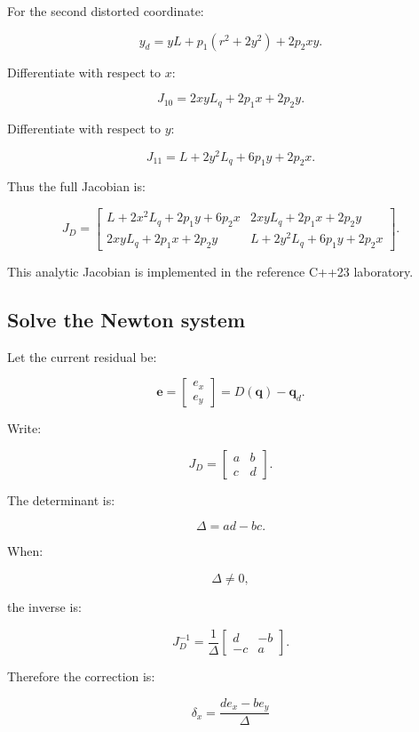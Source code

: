 For the second distorted coordinate:

\[
 y_d=yL+p_1(r^2+2y^2)+2p_2xy.
\]

Differentiate with respect to \(x\):

\[
 \boxed{ J_{10}= 2xyL_q+2p_1x+2p_2y }.
\]

Differentiate with respect to \(y\):

\[
 \boxed{ J_{11}= L+2y^2L_q+6p_1y+2p_2x }.
\]

Thus the full Jacobian is:

\[
 \boxed{ J_D= \begin{bmatrix} L+2x^2L_q+2p_1y+6p_2x& 2xyL_q+2p_1x+2p_2y\\ 2xyL_q+2p_1x+2p_2y& L+2y^2L_q+6p_1y+2p_2x \end{bmatrix} }.
\]

This analytic Jacobian is implemented in the reference C++23 laboratory.

\subsection{Solve the Newton system}\label{02-foundations-ii-ch035-solve-the-newton-system}

\hypertarget{02-foundations-ii-ch035-solve-the-newton-system}{}

Let the current residual be:

\[
 \mathbf e= \begin{bmatrix} e_x\\e_y \end{bmatrix} = D(\mathbf q)-\mathbf q_d.
\]

Write:

\[
 J_D= \begin{bmatrix} a&b\\c&d \end{bmatrix}.
\]

The determinant is:

\[
 \boxed{ \Delta=ad-bc }.
\]

When:

\[
 \Delta\ne0,
\]

the inverse is:

\[
 J_D^{-1} = \frac1\Delta \begin{bmatrix} d&-b\\ -c&a \end{bmatrix}.
\]

Therefore the correction is:

\[
 \boxed{ \delta_x= \frac{de_x-be_y}{\Delta} }
\]

